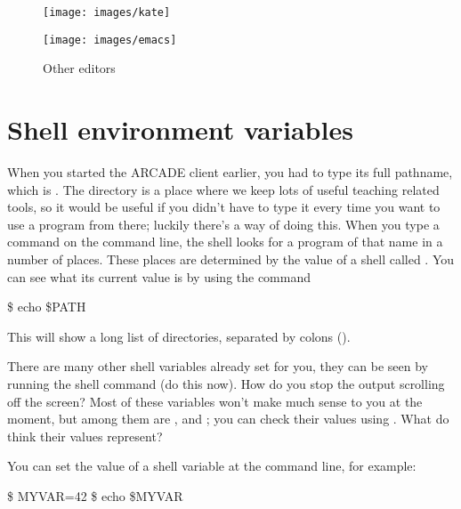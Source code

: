 \begin{figure}
  \begin{minipage}[b]{.5\linewidth}
    \centering
    \texttt{[image: images/kate]}  
    \label{subfig:kate}
  \end{minipage}%
  \begin{minipage}[b]{.5\linewidth}
    \centering
    \texttt{[image: images/emacs]}
    \label{subfig:emacs}
  \end{minipage}%
  \caption{Other editors}  \label{fig:texteditors}
  
\end{figure}

\section{Shell environment variables}

When you started the ARCADE client earlier, you had to type its full
pathname, which is . The directory
 is a place where we keep lots of useful
teaching related tools, so it would be useful if you didn't have to
type it every time you want to use a program from there; luckily
there's a way of doing this. When you type a command on the command
line, the shell looks for a program of that name in a number of
places. These places are determined by the value of a shell
 called
. You can see what its current value is by using the
command

\begin{ttoutenv}
\$ echo \$PATH
\end{ttoutenv}

This will show a long list of directories, separated by colons (\ttout{:}).

There are many other shell variables already set for you, they can be
seen by running the shell command  (do this now). How do you stop the
output scrolling off the screen? Most of these variables won't make
much sense to you at the moment, but among them are ,
 and ; you can check their values using
. What do think their values represent?

You can set the value of a shell variable at the command line, for example:

\begin{ttoutenv}
\$ MYVAR=42
\$ echo \$MYVAR
\end{ttoutenv}


